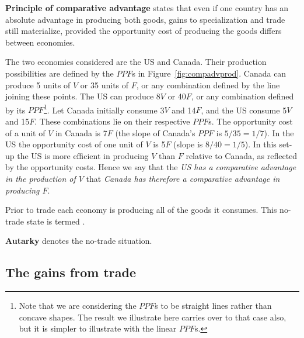 \begin{DefBox}
\textbf{Principle of comparative advantage} states that even if one country has an absolute advantage in producing both goods, gains to specialization and trade still materialize, provided the opportunity cost of producing the goods differs between economies.
\end{DefBox}

The two economies considered are the US and Canada. Their production possibilities are defined by the $PPF$s in Figure~\ref{fig:compadvprod}. Canada can produce 5 units of $V$ or 35 units of $F$, or any combination defined by the line joining these points. The US can produce 8$V$ or 40$F$, or any combination defined by its $PPF$\footnote{Note that we are considering the $PPF$s to be straight lines rather than concave shapes. The result we illustrate here carries over to that case also, but it is simpler to illustrate with the linear $PPF$s.}. Let Canada initially consume 3$V$ and 14$F$, and the US consume 5$V$ and 15$F$. These combinations lie on their respective $PPF$s. The opportunity cost of a unit of $V$ in Canada is 7$F$ (the slope of Canada's $PPF$ is $5/35=1/7$). In the US the opportunity cost of one unit of $V$ is 5$F$ (slope is $8/40=1/5$). In this set-up the US is more efficient in producing $V$ than $F$ relative to Canada, as reflected by the opportunity costs. Hence we say that the \textit{US has a comparative advantage in the production of $V$}  that \textit{Canada has therefore a comparative advantage in producing $F$}. 



Prior to trade each economy is producing all of the goods it consumes. This no-trade state is termed .

\begin{DefBox}
\textbf{Autarky} denotes the no-trade situation.
\end{DefBox}

\subsection*{The gains from trade}


